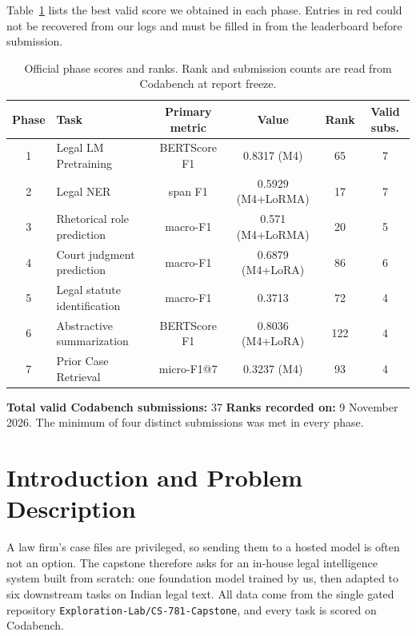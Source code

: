 \documentclass[11pt, oneside]{article}
\begin{document}
\smallskip
\noindent
Table~\ref{tab:leaderboard} lists the best valid score we obtained in each phase. Entries in red could not be recovered from our logs and must be filled in from the leaderboard before submission.
\begin{table}[H]
\centering
\caption{Official phase scores and ranks. Rank and submission counts are read from Codabench at report freeze.}
\label{tab:leaderboard}
\small
\begin{tabular}{clcccc}
\toprule
Phase & Task & Primary metric & Value & Rank & Valid subs. \\
\midrule
1 & Legal LM Pretraining & BERTScore F1 & 0.8317 (M4) & 65 & 7 \\
2 & Legal NER & span F1 & 0.5929 (M4+LoRMA) & 17 & 7 \\
3 & Rhetorical role prediction & macro-F1 & 0.571 (M4+LoRMA) & 20 & 5 \\
4 & Court judgment prediction & macro-F1 & 0.6879 (M4+LoRA) & 86 & 6 \\
5 & Legal statute identification & macro-F1 & 0.3713 & 72 & 4 \\
6 & Abstractive summarization & BERTScore F1 & 0.8036 (M4+LoRA) & 122 & 4 \\
7 & Prior Case Retrieval & micro-F1@7 & 0.3237 (M4) & 93 & 4 \\
\bottomrule
\end{tabular}
\end{table}
\noindent
\textbf{Total valid Codabench submissions:} 37 \quad \textbf{Ranks recorded on:} 9 November 2026.
The minimum of four distinct submissions was met in every phase.

\section{Introduction and Problem Description}
A law firm's case files are privileged, so sending them to a hosted model is often not an option. The capstone therefore asks for an in-house legal intelligence system built from scratch: one foundation model trained by us, then adapted to six downstream tasks on Indian legal text. All data come from the single gated repository \texttt{Exploration-Lab/CS-781-Capstone}, and every task is scored on Codabench.
\end{document}
